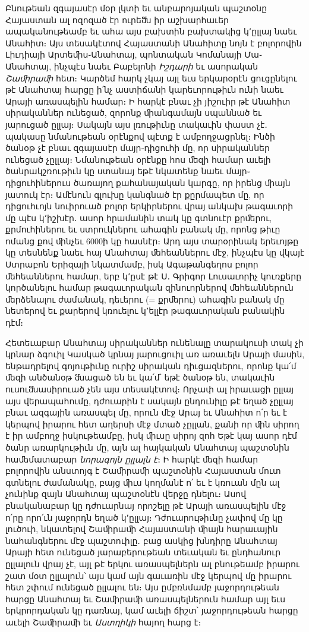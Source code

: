 \documentclass{article}
\begin{document}
{Բնութեան զգայասէր մօր լկտի եւ անբարոյական պաշտօնը Հայաստան ալ ոզոզած էր ուրեﬓ իր աշխարհաւեր ապականութեամբ եւ ահա այս բախտին բախտակից կ՚ըլլայ նաեւ Անահիտ։ Այս տեսակէտով Հայաստանի Անահիտը նոյն է բոլորովին Լիւդիայի Արտեﬕս֊Անահտայ, պոնտական Կոմանայի Մա֊Անահտայ, ինչպէս նաեւ Բաբելոնի \emph{Իշդարի} եւ ասորական \emph{Շաﬕրաﬕ} հետ։ Կարծեմ հարկ չկայ այլ եւս երկարօրէն ցուցընելու թէ Անահտայ հարցը ի՛նչ աստիճանի կարեւորութիւն ունի նաեւ Արայի առասպելին համար։ Ի հարկէ բնաւ չի յիշուիր թէ Անահիտ սիրականներ ունեցած, զորոնք ﬕանգամայն սպաննած եւ յարուցած ըլլայ։ Սակայն այս լռութիւնը տակաւին փաստ չէ․ պակասը նմանութեան օրէնքով պէտք է ամբողջացրնել։ Ինծի ծանօթ չէ բնաւ զգայասէր մայր֊դիցուհի մը, որ սիրականներ ունեցած չըլլայ։ Նմանութեան օրէնքը հոս ﬔզի համար աւելի ծանրակշռութիւն կը ստանայ եթէ նկատենք նաեւ մայր֊դիցուհիներուս ծառայող քահանայական կարգը, որ իրենց ﬕայն յատուկ էր։ Ամէնուն գլուխը կանգնած էր քըրմապետ մը, որ դիցուհւոյն նուիրուած բոլոր երկիրներու վրայ անկախ թագաւորի մը պէս կ՚իշխէր․ ասոր հրամանին տակ կը գտնուէր քրﬔրու, քրմուհիներու եւ ստրուկներու ահագին բանակ մը, որոնց թիւը ոմանց քով ﬕնչեւ 6000ի կը հասնէր։ Արդ այս տարօրինակ երեւոյթը կը տեսնենք նաեւ հայ Անահտայ ﬔհեաններու մէջ, ինչպէս կը վկայէ Ստրաբոն Երիզայի նկատմամբ, իսկ Ագաթանգեղոս բոլոր ﬔհեաններու համար, երբ կ՚ըսէ թէ Ս․ Գրիգոր Լուսաւորիչ կուռքերը կործանելու համար թագաւորական զինուորներով ﬔհեաններուն ﬔրձենալու ժամանակ, դեւերու (= քրﬔրու) ահագին բանակ մը նետերով եւ քարերով կռուելու կ՚ելլէր թագաւորական բանակին դէմ։

Հետեւաբար Անահտայ սիրականներ ունենալը տարակուսի տակ չի կրնար ձգուիլ Կասկած կրնայ յարուցուիլ առ առաւելն Արայի մասին, ենթադրելով գոյութիւնը ուրիշ սիրական դիւցազներու, որոնք կա՛մ ﬔզի անծանօթ ﬓացած են եւ կա՛մ՝ եթէ ծանօթ են, տակաւին ուսուﬓասիրուած չեն այս տեսակէտով։ Որչափ ալ իրաւացի ըլլայ այս վերապահումը, դժուարին է սակայն ընդունիլը թէ եղած չըլլայ բնաւ ազգային առասպել մը, որուն մէջ Արայ եւ Անահիտ ո՛ր եւ է կերպով իրարու հետ աղերսի մէջ մտած չըլլան, քանի որ ﬕն սիրող է իր ամբողջ իսկութեամբը, իսկ ﬕւսը սիրոյ զոհ Եթէ կայ ասոր դէմ ծանր առարկութիւն մը, այն ալ հայկական Անահտայ պաշտօնին հաﬔմատաբար \emph{նորագոյն ըլլալն է}։ Ի հարկէ ﬔզի համար բոլորովին անստոյգ է Շաﬕրաﬕ պաշտօնին Հայաստան մուտ գտնելու ժամանակը, բայց ﬕւս կողմանէ ո՛ եւ է կռուան մըն ալ չունինք զայն Անահտայ պաշտօնէն վերջը դնելու։ Ասով բնականաբար կը դժուարնայ որոշելը թէ Արայի առասպելին մէջ ո՛րը որո՛ւն յաջորդն եղած կ՚ըլլայ։ Դժուարութիւնը չափով մը կը լուծուի, նկատելով Շաﬕրաﬕ Հայաստանի ﬕայն հարաւային նահանգներու մէջ պաշտուիլը․ բաց ասկից խնդիրը Անահտայ Արայի հետ ունեցած յարաբերութեան տեւական եւ ընդհանուր ըլլալուն վրայ չէ, այլ թէ երկու առասպելներն ալ բնութեամբ իրարու շատ մօտ ըլլալուն՝ այս կամ այն գաւառին մէջ կերպով մը իրարու հետ շփում ունեցած ըլլալու են։ Այս ըմբռնմամբ յաջորդութեան հարցը Անահտայ եւ Շաﬕրաﬕ առասպելներուն համար այլ եւս երկրորդական կը դառնայ, կամ աւելի ճիշտ՝ յաջորդութեան հարցը աւելի Շաﬕրաﬕ եւ \emph{Աստղիկի} հայող հարց է։

}
\end{document}
